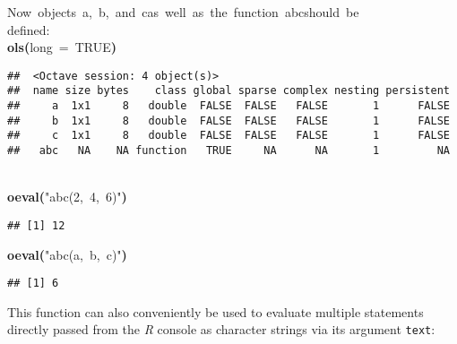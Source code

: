 \documentclass[english,10pt,a4paper]{article}\usepackage{graphicx, color}
\makeatletter
\newcommand{\hlnumber}[1]{\textcolor[rgb]{0,0,0}{#1}}%
\newcommand{\hlfunctioncall}[1]{\textcolor[rgb]{0.501960784313725,0,0.329411764705882}{\textbf{#1}}}%
\newcommand{\hlstring}[1]{\textcolor[rgb]{0.6,0.6,1}{#1}}%
\newcommand{\hlkeyword}[1]{\textcolor[rgb]{0,0,0}{\textbf{#1}}}%
\newcommand{\hlargument}[1]{\textcolor[rgb]{0.690196078431373,0.250980392156863,0.0196078431372549}{#1}}%
\newcommand{\hlcomment}[1]{\textcolor[rgb]{0.180392156862745,0.6,0.341176470588235}{#1}}%
\newcommand{\hlstd}[1]{\textcolor[rgb]{0,0,0}{#1}}%
\newenvironment{kframe}{%
 \def\FrameCommand##1{\hskip\@totalleftmargin \hskip-\fboxsep
 \colorbox{shadecolor}{##1}\hskip-\fboxsep
     \hskip-\linewidth \hskip-\@totalleftmargin \hskip\columnwidth}%
 \MakeFramed {\advance\hsize-\width
   \@totalleftmargin\z@ \linewidth\hsize
   \@setminipage}}%
 {\par\unskip\endMakeFramed}
\newenvironment{knitrout}{}{} %
\let\proglang=\textit
\let\code=\texttt
\newcommand{\R}{\proglang{R}\xspace}
\makeatother
\begin{document}
\begin{knitrout}
\begin{kframe}
\begin{flushleft}
\hlstd{}\hlcomment{\usebox{\hlnormalsizeboxhash}{\ }Now{\ }objects{\ }\usebox{\hlnormalsizeboxsinglequote}a\usebox{\hlnormalsizeboxsinglequote},{\ }\usebox{\hlnormalsizeboxsinglequote}b\usebox{\hlnormalsizeboxsinglequote},{\ }and{\ }\usebox{\hlnormalsizeboxsinglequote}c\usebox{\hlnormalsizeboxsinglequote}{\ }as{\ }well{\ }as{\ }the{\ }function{\ }\usebox{\hlnormalsizeboxsinglequote}abc\usebox{\hlnormalsizeboxsinglequote}{\ }should{\ }be}\hspace*{\fill}\\
\hlstd{}\hlcomment{\usebox{\hlnormalsizeboxhash}{\ }defined:}\hspace*{\fill}\\
\hlstd{}\hlfunctioncall{o\usebox{\hlnormalsizeboxunderscore}ls}\hlkeyword{(}\hlargument{long}{\ }\hlargument{=}{\ }\hlnumber{TRUE}\hlkeyword{)}\mbox{}
\normalfont
\end{flushleft}
\begin{verbatim}
##  <Octave session: 4 object(s)>
##  name size bytes    class global sparse complex nesting persistent
##     a  1x1     8   double  FALSE  FALSE   FALSE       1      FALSE
##     b  1x1     8   double  FALSE  FALSE   FALSE       1      FALSE
##     c  1x1     8   double  FALSE  FALSE   FALSE       1      FALSE
##   abc   NA    NA function   TRUE     NA      NA       1         NA
\end{verbatim}
\begin{flushleft}
\ttfamily\noindent
\hlcomment{\usebox{\hlnormalsizeboxhash}}\hspace*{\fill}\\
\hlstd{}\hlfunctioncall{o\usebox{\hlnormalsizeboxunderscore}eval}\hlkeyword{(}\hlstring{"{}abc(2,{\ }4,{\ }6)"{}}\hlkeyword{)}\mbox{}
\normalfont
\end{flushleft}
\begin{verbatim}
## [1] 12
\end{verbatim}
\begin{flushleft}
\ttfamily\noindent
\hlfunctioncall{o\usebox{\hlnormalsizeboxunderscore}eval}\hlkeyword{(}\hlstring{"{}abc(a,{\ }b,{\ }c)"{}}\hlkeyword{)}\mbox{}
\normalfont
\end{flushleft}
\begin{verbatim}
## [1] 6
\end{verbatim}
\end{kframe}
\end{knitrout}


This function can also conveniently be used to evaluate multiple statements
directly passed from the \R console as character strings via its argument
\code{text}:
\end{document}
